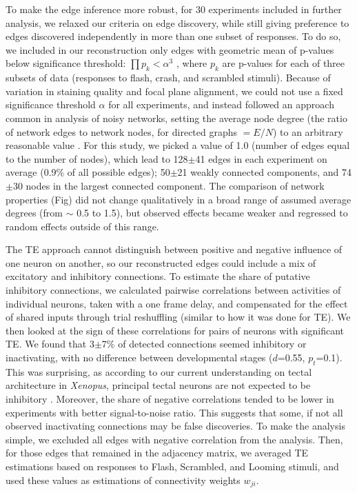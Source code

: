 \documentclass{article}
\begin{document}
To make the edge inference more robust, for 30 experiments included in further analysis, we relaxed our criteria on edge discovery, while still giving preference to edges discovered independently in more than one subset of responses. To do so, we included in our reconstruction only edges with geometric mean of p-values below significance threshold: $\prod{p_k}<\alpha^3$ , where $p_k$ are p-values for each of three subsets of data (responses to flash, crash, and scrambled stimuli). Because of variation in staining quality and focal plane alignment, we could not use a fixed significance threshold $\alpha$ for all experiments, and instead followed an approach common in analysis of noisy networks, setting the average node degree (the ratio of network edges to network nodes, for directed graphs $=E/N$) to an arbitrary reasonable value \citep{stetter2012te}. For this study, we picked a value of 1.0 (number of edges equal to the number of nodes), which lead to 128$\pm$41 edges in each experiment on average (0.9\% of all possible edges); 50$\pm$21 weakly connected components, and 74$\pm$30 nodes in the largest connected component. The comparison of network properties (Fig) did not change qualitatively in a broad range of assumed average degrees (from $\sim$ 0.5 to 1.5), but observed effects became weaker and regressed to random effects outside of this range. 

The TE approach cannot distinguish between positive and negative influence of one neuron on another, so our reconstructed edges could include a mix of excitatory and inhibitory connections. To estimate the share of putative inhibitory connections, we calculated pairwise correlations between activities of individual neurons, taken with a one frame delay, and compensated for the effect of shared inputs through trial reshuffling (similar to how it was done for TE). We then looked at the sign of these correlations for pairs of neurons with significant TE. We found that 3$\pm$7\% of detected connections seemed inhibitory or inactivating, with no difference between developmental stages ($d$=0.55, $p_t$=0.1). This was surprising, as according to our current understanding on tectal architecture in \textit{Xenopus}, principal tectal neurons are not expected to be inhibitory \citep{bell2011polyamines}. Moreover, the share of negative correlations tended to be lower in experiments with better signal-to-noise ratio. This suggests that some, if not all observed inactivating connections may be false discoveries. To make the analysis simple, we excluded all edges with negative correlation from the analysis. Then, for those edges that remained in the adjacency matrix, we averaged TE estimations based on responses to Flash, Scrambled, and Looming stimuli, and used these values as estimations of connectivity weights $w_{ji}$.
\end{document}
